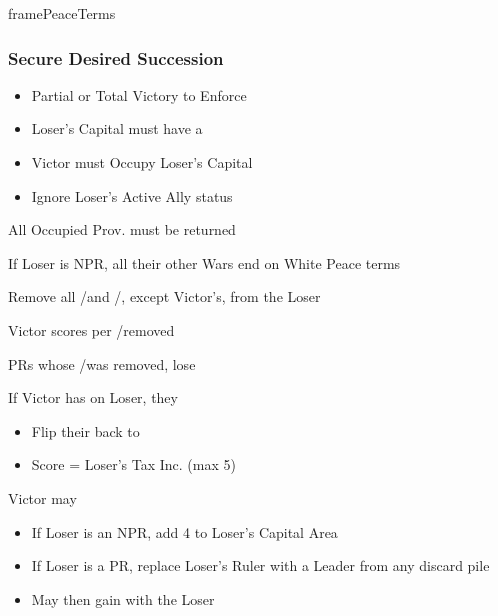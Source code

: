 \documentclass[10pt]{article}
\newlength{\fhPeaceTerms} \setlength\fhPeaceTerms{45.5\baselineskip}
\begin{document}
\begin{dynamiccontents*}{framePeaceTerms}
\begin{eubox}{\fhPeaceTerms}
\begin{multicols}{3}
		\subsubsection*{Secure Desired Succession}
		\begin{itemize}
			{
				\color{peaceReqColor}
				\item {}
				\begin{itemize}
					\item Partial or Total Victory to Enforce
					\item Loser's Capital must have a \disputedsuccession
					\item Victor must Occupy Loser's Capital
					\item Ignore Loser's Active Ally status
				\end{itemize}
			}
			\item All Occupied Prov. must be returned
			\item If Loser is NPR, all their other Wars end on White Peace terms
			\item Remove all \marriage/\disputedsuccession and \alliance/\activeally, except Victor's, from the Loser
			\item Victor scores  per \marriage/\disputedsuccession removed
			\item PRs whose \marriage/\disputedsuccession was removed, lose 
			\item If Victor has \disputedsuccession on Loser, they
			\begin{itemize}
				\item Flip their \disputedsuccession back to \marriage
				\item Score \prestige = Loser's Tax Inc. (max 5)
			\end{itemize}
			\item Victor may
			\begin{itemize}
				\item If Loser is an NPR, add 4 \influence to Loser's Capital Area
				\item If Loser is a PR, replace Loser's Ruler with a Leader from any discard pile
				\item May then gain \alliance with the Loser
			\end{itemize}
		\end{itemize}


\end{multicols}
\end{eubox}
\end{dynamiccontents*}
\end{document}
